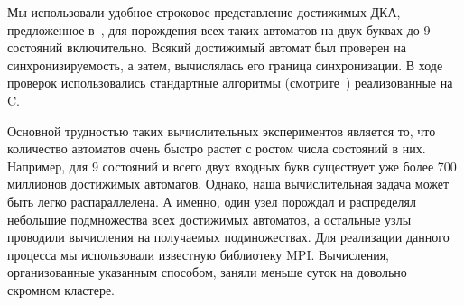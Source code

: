 \documentclass[11pt]{article}
\newcommand{\san}{synchronizing automaton}
\begin{document}

Мы использовали удобное строковое представление достижимых ДКА, предложенное
в~\cite{AMR}, для порождения всех таких автоматов на двух буквах до 9 состояний
включительно. Всякий достижимый автомат был проверен на синхронизируемость, а
затем, вычислялась его граница синхронизации. В ходе проверок использовались
стандартные алгоритмы (смотрите~\cite{Sa05,Vo08}) реализованные на C.


Основной трудностью таких вычислительных экспериментов является то, что количество
автоматов очень быстро растет с ростом числа состояний в них. Например, для 9 состояний
и всего двух входных букв существует уже более 700 миллионов достижимых автоматов.
Однако, наша вычислительная задача может быть легко распараллелена. А именно,
один узел порождал и распределял небольшие подмножества всех достижимых автоматов, а остальные
узлы проводили вычисления на получаемых подмножествах. Для реализации данного процесса
мы использовали известную библиотеку MPI. Вычисления, организованные указанным способом,
заняли меньше суток на довольно скромном кластере.


\end{document}
